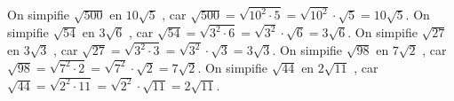 \documentclass[a4paper,12pt]{report}
\begin{document}
\begin{cora}\phantom{ }

\begin{tasks}
\task On simpifie $\sqrt{500}$ en $10\sqrt{5}$ , car
    $\sqrt{500}=\sqrt{10^2\cdot 5} =
    \sqrt{10^2}\cdot \sqrt{5} =
    {{10\sqrt{5}}}$.
\task On simpifie $\sqrt{54}$ en $3\sqrt{6}$ , car
    $\sqrt{54}=\sqrt{3^2\cdot 6} =
    \sqrt{3^2}\cdot \sqrt{6} =
    {{3\sqrt{6}}}$.
\task On simpifie $\sqrt{27}$ en $3\sqrt{3}$ , car
    $\sqrt{27}=\sqrt{3^2\cdot 3} =
    \sqrt{3^2}\cdot \sqrt{3} =
    {{3\sqrt{3}}}$.
\task On simpifie $\sqrt{98}$ en $7\sqrt{2}$ , car
    $\sqrt{98}=\sqrt{7^2\cdot 2} =
    \sqrt{7^2}\cdot \sqrt{2} =
    {{7\sqrt{2}}}$.
\task On simpifie $\sqrt{44}$ en $2\sqrt{11}$ , car
    $\sqrt{44}=\sqrt{2^2\cdot 11} =
    \sqrt{2^2}\cdot \sqrt{11} =
    {{2\sqrt{11}}}$.
\end{tasks}

\end{cora}
\end{document}
